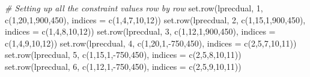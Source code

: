 \documentclass[
]{article}
\newenvironment{Shaded}{\begin{snugshade}}{\end{snugshade}}
\newcommand{\AttributeTok}[1]{\textcolor[rgb]{0.77,0.63,0.00}{#1}}
\newcommand{\CommentTok}[1]{\textcolor[rgb]{0.56,0.35,0.01}{\textit{#1}}}
\newcommand{\DecValTok}[1]{\textcolor[rgb]{0.00,0.00,0.81}{#1}}
\newcommand{\FunctionTok}[1]{\textcolor[rgb]{0.00,0.00,0.00}{#1}}
\newcommand{\NormalTok}[1]{#1}
\newcommand{\SpecialCharTok}[1]{\textcolor[rgb]{0.00,0.00,0.00}{#1}}
\begin{document}
\begin{Shaded}
\begin{Highlighting}[]
\CommentTok{\# Setting up all the constraint values row by row}
\FunctionTok{set.row}\NormalTok{(lprecdual, }\DecValTok{1}\NormalTok{, }\FunctionTok{c}\NormalTok{(}\DecValTok{1}\NormalTok{,}\DecValTok{20}\NormalTok{,}\DecValTok{1}\NormalTok{,}\DecValTok{900}\NormalTok{,}\DecValTok{450}\NormalTok{), }\AttributeTok{indices =} \FunctionTok{c}\NormalTok{(}\DecValTok{1}\NormalTok{,}\DecValTok{4}\NormalTok{,}\DecValTok{7}\NormalTok{,}\DecValTok{10}\NormalTok{,}\DecValTok{12}\NormalTok{))}
\FunctionTok{set.row}\NormalTok{(lprecdual, }\DecValTok{2}\NormalTok{, }\FunctionTok{c}\NormalTok{(}\DecValTok{1}\NormalTok{,}\DecValTok{15}\NormalTok{,}\DecValTok{1}\NormalTok{,}\DecValTok{900}\NormalTok{,}\DecValTok{450}\NormalTok{), }\AttributeTok{indices =} \FunctionTok{c}\NormalTok{(}\DecValTok{1}\NormalTok{,}\DecValTok{4}\NormalTok{,}\DecValTok{8}\NormalTok{,}\DecValTok{10}\NormalTok{,}\DecValTok{12}\NormalTok{))}
\FunctionTok{set.row}\NormalTok{(lprecdual, }\DecValTok{3}\NormalTok{, }\FunctionTok{c}\NormalTok{(}\DecValTok{1}\NormalTok{,}\DecValTok{12}\NormalTok{,}\DecValTok{1}\NormalTok{,}\DecValTok{900}\NormalTok{,}\DecValTok{450}\NormalTok{), }\AttributeTok{indices =} \FunctionTok{c}\NormalTok{(}\DecValTok{1}\NormalTok{,}\DecValTok{4}\NormalTok{,}\DecValTok{9}\NormalTok{,}\DecValTok{10}\NormalTok{,}\DecValTok{12}\NormalTok{))}
\FunctionTok{set.row}\NormalTok{(lprecdual, }\DecValTok{4}\NormalTok{, }\FunctionTok{c}\NormalTok{(}\DecValTok{1}\NormalTok{,}\DecValTok{20}\NormalTok{,}\DecValTok{1}\NormalTok{,}\SpecialCharTok{{-}}\DecValTok{750}\NormalTok{,}\DecValTok{450}\NormalTok{), }\AttributeTok{indices =} \FunctionTok{c}\NormalTok{(}\DecValTok{2}\NormalTok{,}\DecValTok{5}\NormalTok{,}\DecValTok{7}\NormalTok{,}\DecValTok{10}\NormalTok{,}\DecValTok{11}\NormalTok{))}
\FunctionTok{set.row}\NormalTok{(lprecdual, }\DecValTok{5}\NormalTok{, }\FunctionTok{c}\NormalTok{(}\DecValTok{1}\NormalTok{,}\DecValTok{15}\NormalTok{,}\DecValTok{1}\NormalTok{,}\SpecialCharTok{{-}}\DecValTok{750}\NormalTok{,}\DecValTok{450}\NormalTok{), }\AttributeTok{indices =} \FunctionTok{c}\NormalTok{(}\DecValTok{2}\NormalTok{,}\DecValTok{5}\NormalTok{,}\DecValTok{8}\NormalTok{,}\DecValTok{10}\NormalTok{,}\DecValTok{11}\NormalTok{))}
\FunctionTok{set.row}\NormalTok{(lprecdual, }\DecValTok{6}\NormalTok{, }\FunctionTok{c}\NormalTok{(}\DecValTok{1}\NormalTok{,}\DecValTok{12}\NormalTok{,}\DecValTok{1}\NormalTok{,}\SpecialCharTok{{-}}\DecValTok{750}\NormalTok{,}\DecValTok{450}\NormalTok{), }\AttributeTok{indices =} \FunctionTok{c}\NormalTok{(}\DecValTok{2}\NormalTok{,}\DecValTok{5}\NormalTok{,}\DecValTok{9}\NormalTok{,}\DecValTok{10}\NormalTok{,}\DecValTok{11}\NormalTok{))}

\end{Highlighting}
\end{Shaded}
\end{document}
